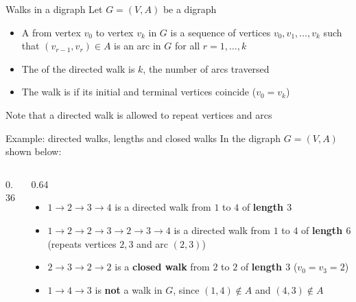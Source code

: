 \documentclass[aspectratio=169]{beamer}\usepackage[]{graphicx}\usepackage[]{xcolor}
\begin{document}
\begin{frame}{Walks in a digraph}
Let $G = (V, A)$ be a digraph
\vfill
\begin{importantdefinition}
\begin{itemize}
\item A  from vertex $v_0$ to vertex $v_k$ in $G$ is a sequence of vertices $v_0, v_1, \ldots, v_k$ such that $(v_{r-1}, v_r) \in A$ is an arc in $G$ for all $r = 1, \ldots, k$
\item The  of the directed walk is $k$, the number of arcs traversed
\item The walk is  if its initial and terminal vertices coincide ($v_0 = v_k$)
\end{itemize}
\end{importantdefinition}
\vfill
Note that a directed walk is allowed to repeat vertices and arcs
\end{frame}

\begin{frame}{Example: directed walks, lengths and closed walks}
In the digraph $G = (V, A)$ shown below:
\vfill
\begin{columns}[c]
\begin{column}{0.36\textwidth}
\centering
{}
\end{column}
\begin{column}{0.64\textwidth}
\begin{itemize}
\item $1 \to 2 \to 3 \to 4$ is a directed walk from $1$ to $4$ of \textbf{length $3$}
\vfill
\item $1 \to 2 \to 2 \to 3 \to 2 \to 3 \to 4$ is a directed walk from $1$ to $4$ of \textbf{length $6$} (repeats vertices $2, 3$ and arc $(2, 3)$)
\vfill
\item $2 \to 3 \to 2 \to 2$ is a \textbf{closed walk} from $2$ to $2$ of \textbf{length $3$} ($v_0 = v_3 = 2$)
\vfill
\item $1 \to 4 \to 3$ is \textbf{not} a walk in $G$, since $(1, 4) \notin A$ and $(4, 3) \notin A$
\end{itemize}
\end{column}
\end{columns}
\end{frame}
\end{document}
